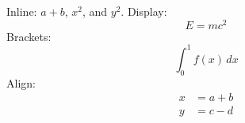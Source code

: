 Inline: $a+b$, $x^2$, and \(y^2\).
Display: $$E=mc^2$$
Brackets: \[ \int_0^1 f(x)\,dx \]
Align:
\begin{align}
x &= a + b \\
y &= c - d
\end{align}
